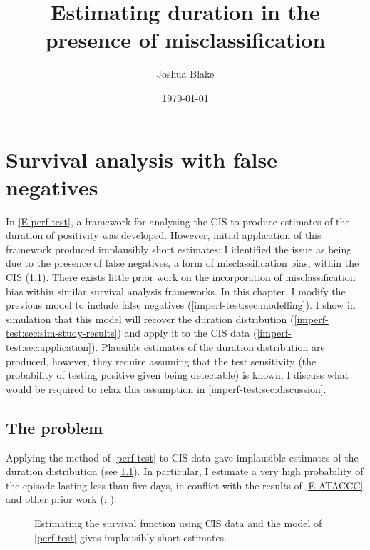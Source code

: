 \documentclass[thesis.tex]{subfiles}
\title{Estimating duration in the presence of misclassification}
\author{Joshua Blake}
\date{\today}
\begin{document}
\chapter{Survival analysis with false negatives} \label{imperf-test}

In \cref{E-perf-test}, a framework for analysing the CIS to produce estimates of the duration of positivity was developed.
However, initial application of this framework produced implausibly short estimates; I identified the issue as being due to the presence of false negatives, a form of misclassification bias, within the CIS (\cref{imperf-test:sec:problem}).
There exists little prior work on the incorporation of misclassification bias within similar survival analysis frameworks.
In this chapter, I modify the previous model to include false negatives (\cref{imperf-test:sec:modelling}).
I show in simulation that this model will recover the duration distribution (\cref{imperf-test:sec:sim-study-results}) and apply it to the CIS data (\cref{imperf-test:sec:application}).
Plausible estimates of the duration distribution are produced, however, they require assuming that the test sensitivity (the probability of testing positive given being detectable) is known; I discuss what would be required to relax this assumption in \cref{imperf-test:sec:discussion}.

\section{The problem} \label{imperf-test:sec:problem}

Applying the method of \cref{perf-test} to CIS data gave implausible estimates of the duration distribution (see \cref{imperf-test:fig:problem-cis-estimates}).
In particular, I estimate a very high probability of the episode lasting less than five days, in conflict with the results of \cref{E-ATACCC} and other prior work (\eg: \autocite{cevikShedding}).

\begin{figure}
  \centering %
  \caption[Estimating survival using CIS data assuming perfect testing]{Estimating the survival function using CIS data and the model of \cref{perf-test} gives implausibly short estimates. \label{imperf-test:fig:problem-cis-estimates}}
\end{figure}
\end{document}
